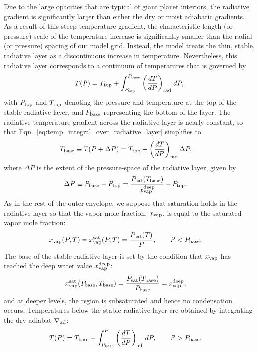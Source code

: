 \documentclass[11pt]{ucscthesisbs}
\begin{document}
Due to the large opacities that are typical of giant planet interiors, the radiative gradient is significantly larger than either the dry or moist adiabatic gradients. As a result of this steep temperature gradient, the characteristic length (or pressure) scale of the temperature increase is significantly smaller than the radial (or pressure) spacing of our model grid. Instead, the model treats the thin, stable, radiative layer as a discontinuous increase in temperature. Nevertheless, this radiative layer corresponds to a continuum of temperatures that is governed by
\begin{equation}
  T(P) = T_{\rm top} + \int_{P_{\rm top}}^{P_{\rm base}} \left(\frac{dT}{dP}\right)_{\rm rad}\,d P ,
  \label{eq:temp_integral_over_radiative_layer}
\end{equation}
with $P_{\rm top}$ and $T_{\rm top}$ denoting the pressure and temperature at the top of the stable radiative layer, and $P_{\rm base}$ representing the bottom of the layer. The radiative temperature gradient across the radiative layer is nearly constant, so that Eqn.~\ref{eq:temp_integral_over_radiative_layer} simplifies to
\begin{align}
T_{\rm base}\equiv T(P+\Delta P) &= T_{\rm top} + \left(\frac{dT}{dP}\right)_{\rm rad}\Delta P ,
\label{eq:temperature_profile_over_radiative_layer_simplification}
\end{align}
where $\Delta P$ is the extent of the pressure-space of the radiative layer, given by
\begin{align}
\Delta P \equiv P_{\rm base}-P_{\rm top} &= \frac{P_{\rm sat}(T_{\rm base})}{x_{\rm vap}^{\rm deep}} - P_{\rm top}.
\label{eq:delta_P_over_radiative_layer}
\end{align}
As in the rest of the outer envelope, we suppose that saturation holds in the radiative layer so that the vapor mole fraction, $x_{\rm vap}$, is equal to the saturated vapor mole fraction:
\begin{align}
x_{\rm vap}(P, T) &= x_{\rm vap}^{\rm sat}(P, T) = \frac{P_{\rm sat}(T)}{P}, \qquad P<P_{\rm base}.
\label{eq:vapor_mole_fraction_within_condensation_zone}
\end{align}
The base of the stable radiative layer is set by the condition that $x_{\rm vap}$ has reached the deep water value $x_{\rm vap}^{\rm deep}$:
\begin{align}
x_{\rm vap}^{\rm sat}(P_{\rm base}, T_{\rm base}) &= \frac{P_{\rm sat}(T_{\rm base})}{P_{\rm base}}=x_{\rm vap}^{\rm deep},
\label{eq:cloud_base}
\end{align}
and at deeper levels, the region is subsaturated and hence no condensation occurs. Temperatures below the stable radiative layer are obtained by integrating the dry adiabat $\nabla_{\rm ad}$:
\begin{align}
T(P) &= T_{\rm base} + \int_{P_{\rm base}}^P\left(\frac{dT}{dP}\right)_{\rm ad}\,d P, \qquad  P>P_{\rm base} .
\label{eq:dry_adiabat_integration}
\end{align}
\end{document}
